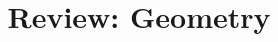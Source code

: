 \documentclass[a4paper,12pt]{article}
\begin{document}
\title{Review: Geometry}
\newcommand\event{S.3,4 Elite Mathematics Training}
\newcommand\learningobjective{
\item Review the basic geometric theorems
\item Review triangle centers
}

\myfrontpage









\begin{question}[]{4}
    
    
    
    
    
    
    
\end{question}
\end{document}
